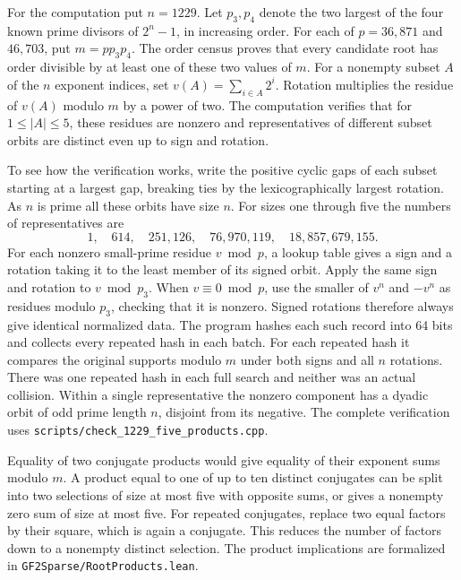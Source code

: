 \documentclass[11pt]{article}
\begin{document}
For the computation put \(n=1229\). Let \(p_3,p_4\) denote the
two largest of the four known prime divisors of \(2^n-1\), in
increasing order. For each of \(p=36{,}871\) and \(46{,}703\), put
\(m=p p_3 p_4\). The order census proves that every candidate root
has order divisible by at least one of these two values of \(m\).
For a nonempty subset \(A\) of the \(n\) exponent indices, set
\(v(A)=\sum_{i\in A}2^i\). Rotation multiplies the residue of
\(v(A)\) modulo \(m\) by a power of two. The computation verifies that
for \(1\le |A|\le5\), these residues are nonzero and representatives
of different subset orbits are distinct even up to sign and rotation.

To see how the verification works, write the positive cyclic gaps
of each subset starting at a largest gap, breaking ties by the
lexicographically largest rotation. As \(n\) is prime all these
orbits have size \(n\). For sizes one through five the numbers of
representatives are
\[
  1,\quad 614,\quad 251{,}126,\quad 76{,}970{,}119,\quad
  18{,}857{,}679{,}155.
\]
For each nonzero small-prime residue \(v\bmod p\), a lookup table
gives a sign and a rotation taking it to the least member of its
signed orbit. Apply the same sign and rotation to \(v\bmod p_3\).
When \(v\equiv0\bmod p\), use the smaller of \(v^n\) and \(-v^n\)
as residues modulo \(p_3\), checking that it is nonzero.
Signed rotations therefore always give identical normalized data.
The program hashes each such record into 64 bits and collects every
repeated hash in each batch. For each repeated hash it compares the
original supports modulo \(m\) under both signs and all \(n\)
rotations. There was one repeated hash in each full search and neither
was an actual collision. Within a single representative the nonzero
component has a dyadic orbit of odd prime length \(n\), disjoint
from its negative. The complete verification uses
\nolinkurl{scripts/check_1229_five_products.cpp}.

Equality of two conjugate products would give equality of their
exponent sums modulo \(m\). A product equal to one of up to ten
distinct conjugates can be split into two selections of size at
most five with opposite sums, or gives a nonempty zero sum of size
at most five. For repeated conjugates, replace two equal factors
by their square, which is again a conjugate. This reduces the number
of factors down to a nonempty distinct selection. The product
implications are formalized in \nolinkurl{GF2Sparse/RootProducts.lean}.
\end{document}
